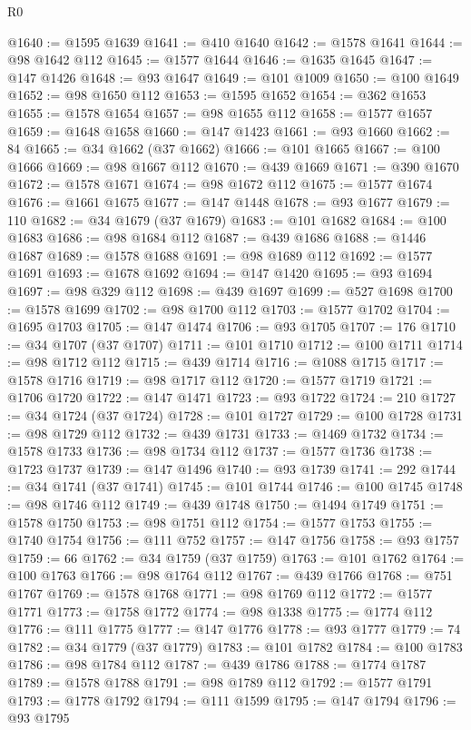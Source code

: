 \begin{lexlean}{R0}
\begin{coremodule}
@1640 := @1595 @1639
@1641 := @410 @1640
@1642 := @1578 @1641
@1644 := @98 @1642 @112
@1645 := @1577 @1644
@1646 := @1635 @1645
@1647 := @147 @1426
@1648 := @93 @1647
@1649 := @101 @1009
@1650 := @100 @1649
@1652 := @98 @1650 @112
@1653 := @1595 @1652
@1654 := @362 @1653
@1655 := @1578 @1654
@1657 := @98 @1655 @112
@1658 := @1577 @1657
@1659 := @1648 @1658
@1660 := @147 @1423
@1661 := @93 @1660
@1662 := 84
@1665 := @34 @1662 (@37 @1662)
@1666 := @101 @1665
@1667 := @100 @1666
@1669 := @98 @1667 @112
@1670 := @439 @1669
@1671 := @390 @1670
@1672 := @1578 @1671
@1674 := @98 @1672 @112
@1675 := @1577 @1674
@1676 := @1661 @1675
@1677 := @147 @1448
@1678 := @93 @1677
@1679 := 110
@1682 := @34 @1679 (@37 @1679)
@1683 := @101 @1682
@1684 := @100 @1683
@1686 := @98 @1684 @112
@1687 := @439 @1686
@1688 := @1446 @1687
@1689 := @1578 @1688
@1691 := @98 @1689 @112
@1692 := @1577 @1691
@1693 := @1678 @1692
@1694 := @147 @1420
@1695 := @93 @1694
@1697 := @98 @329 @112
@1698 := @439 @1697
@1699 := @527 @1698
@1700 := @1578 @1699
@1702 := @98 @1700 @112
@1703 := @1577 @1702
@1704 := @1695 @1703
@1705 := @147 @1474
@1706 := @93 @1705
@1707 := 176
@1710 := @34 @1707 (@37 @1707)
@1711 := @101 @1710
@1712 := @100 @1711
@1714 := @98 @1712 @112
@1715 := @439 @1714
@1716 := @1088 @1715
@1717 := @1578 @1716
@1719 := @98 @1717 @112
@1720 := @1577 @1719
@1721 := @1706 @1720
@1722 := @147 @1471
@1723 := @93 @1722
@1724 := 210
@1727 := @34 @1724 (@37 @1724)
@1728 := @101 @1727
@1729 := @100 @1728
@1731 := @98 @1729 @112
@1732 := @439 @1731
@1733 := @1469 @1732
@1734 := @1578 @1733
@1736 := @98 @1734 @112
@1737 := @1577 @1736
@1738 := @1723 @1737
@1739 := @147 @1496
@1740 := @93 @1739
@1741 := 292
@1744 := @34 @1741 (@37 @1741)
@1745 := @101 @1744
@1746 := @100 @1745
@1748 := @98 @1746 @112
@1749 := @439 @1748
@1750 := @1494 @1749
@1751 := @1578 @1750
@1753 := @98 @1751 @112
@1754 := @1577 @1753
@1755 := @1740 @1754
@1756 := @111 @752
@1757 := @147 @1756
@1758 := @93 @1757
@1759 := 66
@1762 := @34 @1759 (@37 @1759)
@1763 := @101 @1762
@1764 := @100 @1763
@1766 := @98 @1764 @112
@1767 := @439 @1766
@1768 := @751 @1767
@1769 := @1578 @1768
@1771 := @98 @1769 @112
@1772 := @1577 @1771
@1773 := @1758 @1772
@1774 := @98 @1338
@1775 := @1774 @112
@1776 := @111 @1775
@1777 := @147 @1776
@1778 := @93 @1777
@1779 := 74
@1782 := @34 @1779 (@37 @1779)
@1783 := @101 @1782
@1784 := @100 @1783
@1786 := @98 @1784 @112
@1787 := @439 @1786
@1788 := @1774 @1787
@1789 := @1578 @1788
@1791 := @98 @1789 @112
@1792 := @1577 @1791
@1793 := @1778 @1792
@1794 := @111 @1599
@1795 := @147 @1794
@1796 := @93 @1795

\end{coremodule}
\end{lexlean}

